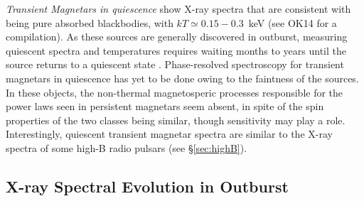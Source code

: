 \noindent
{\it Transient Magnetars in quiescence}
show X-ray spectra that are consistent with being
pure absorbed blackbodies, with $kT \simeq 0.15-0.3$~keV (see OK14 for a compilation).
As these sources are generally
discovered in outburst, measuring quiescent spectra and temperatures requires waiting
months to years until the source returns to a quiescent state \citep[e.g.][]{ah16}.
Phase-resolved spectroscopy for transient magnetars in quiescence has yet to be done owing to the faintness
of the sources.  In these objects, the non-thermal magnetosperic processes responsible
for the power laws seen in persistent magnetars seem absent, in spite of the spin properties of
the two classes being similar, though sensitivity may play a role.  
Interestingly, quiescent transient magnetar spectra are similar to the
X-ray spectra of some high-B radio pulsars (see \S\ref{sec:highB}).


\subsection{X-ray Spectral Evolution in Outburst}
\label{sec:specevol}

